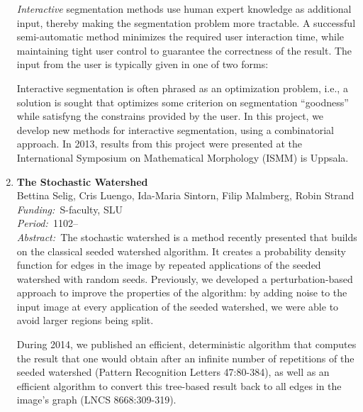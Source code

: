 \documentclass[10pt, a4paper]{article}
\newcommand{\aabstract}[1]{\emph{Abstract:~}#1}
\newcommand{\ffunding}[1]{\emph{Funding:~}#1\\}
\newcommand{\pperiod}[1]{\emph{Period:~}#1\\}
\begin{document}
\begin{enumerate}
{\emph{Interactive} segmentation methods use human expert knowledge as additional input, thereby making the segmentation problem more tractable. A successful semi-automatic method minimizes the required user interaction time, while maintaining tight user control to guarantee the correctness of the result. The input from the user is typically given in one of two forms:


Interactive segmentation is often phrased as an optimization problem, i.e., a solution is sought that optimizes some  criterion on segmentation ``goodness'' while satisfyng the constrains provided by the user. In this project, we develop new methods for interactive segmentation, using a combinatorial approach. In 2013, results from this project were presented at the International Symposium on Mathematical Morphology (ISMM) is Uppsala.} 


\item
\label{proj:stochwatershed}
\textbf{The Stochastic Watershed}\\
Bettina Selig, Cris Luengo, Ida-Maria Sintorn, Filip Malmberg, Robin Strand\\
\ffunding{S-faculty, SLU}
\pperiod{1102--}
\aabstract{The stochastic watershed is a method recently presented that builds on the classical seeded watershed algorithm. It creates a probability density function for edges in the image by repeated applications of the seeded watershed with random seeds. Previously, we developed a perturbation-based approach to improve the properties of the algorithm: by adding noise to the input image at every application of the seeded watershed, we were able to avoid larger regions being split.

During 2014, we published an efficient, deterministic algorithm that computes the result that one would obtain after an infinite number of repetitions of the seeded watershed (Pattern Recognition Letters 47:80-384), as well as an efficient algorithm to convert this tree-based result back to all edges in the image's graph (LNCS 8668:309-319).

}
\end{enumerate}
\end{document}
